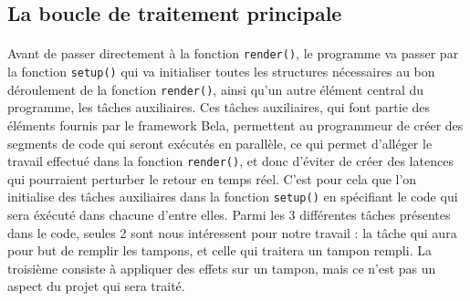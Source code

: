 \subsection{La boucle de traitement principale}
\paragraph{}
Avant de passer directement à la fonction \verb!render()!, le programme va passer par la fonction \verb!setup()! qui va initialiser toutes les structures nécessaires au bon déroulement de la fonction \verb!render()!, ainsi qu'un autre élément central du programme, les tâches auxiliaires. Ces tâches auxiliaires, qui font partie des éléments fournis par le framework Bela, permettent au programmeur de créer des segments de code qui seront exécutés en parallèle, ce qui permet d'alléger le travail effectué dans la fonction \verb!render()!, et donc d'éviter de créer des latences qui pourraient perturber le retour en temps réel. C'est pour cela que l'on initialise des tâches auxiliaires dans la fonction \verb!setup()! en spécifiant le code qui sera éxécuté dans chacune d'entre elles. Parmi les 3 différentes tâches présentes dans le code, seules 2 sont nous intéressent pour notre travail : la tâche qui aura pour but de remplir les tampons, et celle qui traitera un tampon rempli. La troisième consiste à appliquer des effets sur un tampon, mais ce n'est pas un aspect du projet qui sera traité.
